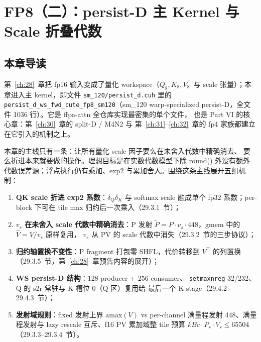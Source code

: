 \chapter{FP8（二）：persist-D 主 Kernel 与 Scale 折叠代数}\label{ch:29}

\section{本章导读}

第~\ref{ch:28}~章把 fp16 输入变成了量化 workspace（$Q_8,K_8,V_8^{\top}$ 与
scale 张量）；本章进入主 kernel，即文件 \texttt{sm\_120/persist\_d.cuh} 里的
\texttt{persist\_d\_ws\_fwd\allowbreak{}\_cute\_fp8\allowbreak{}\_sm120}（sm\_120 warp-specialized
persist-D，全文件 1036 行）。它是 ffpa-attn 全仓库实现最密集的单个文件，
也是 Part VI 的核心章：第~\ref{ch:30}~章的 split-D / M4N2 与
第~\ref{ch:31}--\ref{ch:32}~章的 fp4 家族都建立在它引入的机制之上。

本章的主线只有一条：让所有量化 scale 因子要么在未舍入代数中精确消去、
要么折进本来就要做的操作。理想目标是在实数代数模型下除 round() 外没有额外
代数误差源；浮点执行仍有乘加、exp2 与累加舍入。围绕这条主线展开五组机制：
\begin{enumerate}[itemsep=0pt,topsep=2pt]
  \item \textbf{QK scale 折进 exp2 系数}：$\delta_Q\delta_K$ 与 softmax scale
        融成单个 fp32 系数；per-block 下可在 tile max 归约后一次乘入（29.3.1~节）；
  \item \textbf{$v_s$ 在未舍入 scale 代数中精确消去}：P 发射
        $\tilde P = P\cdot v_s\cdot448$，gmem 中的 $\hat V = V/v_s$ 原样复用，
        $v_s$ 从 PV 的 scale 代数中消失（29.3.2~节的三步协议）；
  \item \textbf{归约轴置换不变性}：P fragment 打包零 SHFL，代价转移到
        $V^{\top}$ 的列置换（29.3.5~节，第~\ref{ch:28}~章预告内容的展开）；
  \item \textbf{WS persist-D 结构}：128 producer + 256 consumer、
        \texttt{setmaxnreg} 32/232、Q 的 s2r 常驻与 K 槽位 0（Q 区）复用给
        最后一个 K stage（29.4.2--29.4.3~节）；
  \item \textbf{发射域规则}：fixed 发射上界 $\mathrm{amax}(V)$ vs per-channel
        满量程发射 448、满量程发射与 lazy rescale 互斥、f16 PV 累加域整 tile
        预算 $kBc\cdot P_r\cdot V_r\le65504$（29.3.3--29.3.4~节）。
\end{enumerate}

